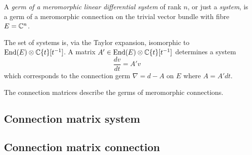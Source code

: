 \begin{comment}
  Some Literature like \cite{sabbah_cimpa90} always talks about germs\dots
\end{comment}
\begin{defn}
  A \emph{germ of a meromorphic linear differential system} of rank $n$, or
  just a \emph{system}, is a germ of a meromorphic connection on the trivial
  vector bundle with fibre $E=\mathbb{C}^n$.
\end{defn}
The set of systems is, via the Taylor expansion, isomorphic to
$\operatorname{End}(E)\otimes\mathbb{C}\{t\}[t^{-1}]$. A matrix
$A'\in\operatorname{End}(E)\otimes\mathbb{C}\{t\}[t^{-1}]$ determines a system
\[
  \frac{dv}{dt}=A'v
\]
which corresponds to the connection germ $\nabla=d-A$ on $E$ where $A=A'dt$.
\begin{comment}
  \cite{boalch} wants \textbf{generic} meromorphic connections
  \begin{itemize}
    \item\dots simplest jet sufficient\dots
  \end{itemize}
\end{comment}

\begin{comment}
  \TODO[Gauge transformation]
  \begin{itemize}
    \item meromorphic transformation \cite{Loday1994} p. 852
    \item holomorphic trasformation
  \end{itemize}
\end{comment}

\begin{cor}
  The connection matrices describe the germs of meromorphic connections.
\end{cor}

\subsection{Connection matrix \leftrightarrow{} system}
\subsection{Connection matrix \rightarrow{} connection}
\begin{comment}
  There is a thm in \cite{sabbah2007isomonodromic}
\end{comment}

